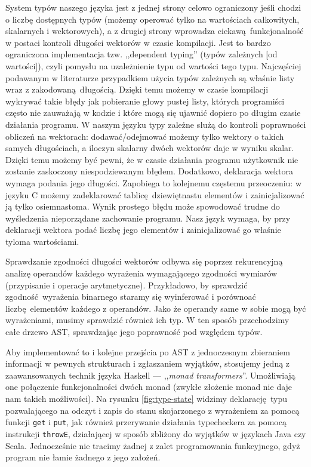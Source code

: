 System typów naszego języka jest z jednej strony celowo ograniczony jeśli chodzi o liczbę dostępnych typów (możemy operować tylko na wartościach całkowitych, skalarnych i wektorowych), a z drugiej strony wprowadza ciekawą funkcjonalność w postaci kontroli długości wektorów w czasie kompilacji. Jest to bardzo ograniczona implementacja tzw. ,,dependent typing'' (typów zależnych [od wartości]), czyli pomysłu na uzależnienie typu od wartości tego typu. Najczęściej podawanym w literaturze przypadkiem użycia typów zależnych są właśnie listy wraz z zakodowaną długością. Dzięki temu możemy w czasie kompilacji wykrywać takie błędy jak pobieranie głowy pustej listy, których programiści często nie zauważają w kodzie i które mogą się ujawnić dopiero po długim czasie działania programu. W naszym języku typy zależne służą do kontroli poprawności obliczeń na wektorach: dodawać/odejmować możemy tylko wektory o takich samych długościach, a iloczyn skalarny dwóch wektorów daje w wyniku skalar. Dzięki temu możemy być pewni, że w czasie działania programu użytkownik nie zostanie zaskoczony niespodziewanym błędem. Dodatkowo, deklaracja wektora wymaga podania jego długości. Zapobiega to kolejnemu częstemu przeoczeniu: w języku C możemy zadeklarować tablicę dziewiętnastu elementów i zainicjalizować ją tylko osiemnastoma. Wynik prostego błędu może spowodować trudne do wyśledzenia nieporządane zachowanie programu. Nasz język wymaga, by przy deklaracji wektora podać liczbę jego elementów i zainicjalizować go właśnie tyloma wartościami.

Sprawdzanie zgodności długości wektorów odbywa się poprzez rekurencyjną analizę operandów każdego wyrażenia wymagającego zgodności wymiarów (przypisanie i operacje arytmetyczne). Przykładowo, by sprawdzić zgodność wyrażenia binarnego staramy się wyinferować i porównoać liczbę elementów każdego z operandów. Jako że operandy same w sobie mogą być wyrażeniami, musimy sprawdzić również ich typ. W ten sposób przechodzimy całe drzewo AST, sprawdzając jego poprawność pod względem typów.

Aby implementować to i kolejne przejścia po AST z jednoczesnym zbieraniem informacji w pewnych strukturach i zgłaszaniem wyjątków, stosujemy jedną z zaawansowanych technik języka Haskell --- ,,\textit{monad transformers}''. Umożliwiają one połączenie funkcjonalności dwóch monad (zwykłe złożenie monad nie daje nam takich możliwości). Na rysunku \ref{fig:type-state} widzimy deklarację typu pozwalającego na odczyt i zapis do stanu skojarzonego z wyrażeniem za pomocą funkcji \texttt{get} i \texttt{put}, jak również przerywanie działania typecheckera za pomocą instrukcji \texttt{throwE}, działającej w sposób zbliżony do wyjątków w językach Java czy Scala. Jednocześnie nie tracimy żadnej z zalet programowania funkcyjnego, gdyż program nie łamie żadnego z jego założeń.

